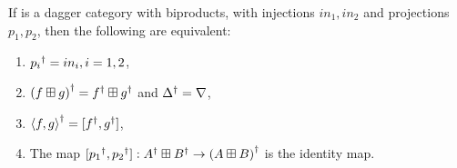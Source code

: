 \begin{lemma}\label{lemma:daggerbiproducts}
If \cD{} is a dagger category with biproducts, with injections $in_{1},in_{2}$ and projections
$p_{1},p_{2}$, then the following are equivalent:
\begin{enumerate}[{(}i{)}]
  \item ${p_{i}}^{\dagger} = in_{i}, i=1,2$, \label{ldpdgrpisq}
  \item ${(f\boxplus g)}^{\dagger} = {f}^{\dagger}\boxplus {g}^{\dagger}$ and ${\Delta}^{\dagger} = \nabla$,\label{ldpddeltisnab}
  \item ${\langle f,g\rangle}^{\dagger} = [{f}^{\dagger},{g}^{\dagger}]$,\label{ldpdcopisprod}
  \item The map $[{p_{1}}^{\dagger},{p_{2}}^{\dagger}]: {A}^{\dagger} \boxplus {B}^{\dagger} \to {(A\boxplus B)}^{\dagger}$ is
    the identity map.\label{ldpcommute}
\end{enumerate}
\end{lemma}
